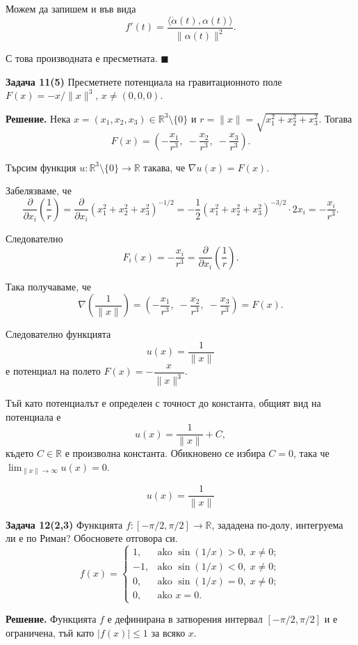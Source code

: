 \documentclass[10pt]{article}
\begin{document}
Можем да запишем и във вида
\[
f'(t) = \frac{\langle \dot\alpha(t),\alpha(t)\rangle}{\|\alpha(t)\|^2}.
\]

С това производната е пресметната. $\blacksquare$

\textbf{Задача 11(5) }Пресметнете потенциала на гравитационното поле $F(x) = -x/\|x\|^3$, $x \neq (0,0,0)$.

\textbf{Решение.} 
Нека $x = (x_1,x_2,x_3) \in \mathbb{R}^3 \setminus \{0\}$ и $r = \|x\| = \sqrt{x_1^2 + x_2^2 + x_3^2}$. Тогава
\[
F(x) = \left( -\frac{x_1}{r^3},\; -\frac{x_2}{r^3},\; -\frac{x_3}{r^3} \right).
\]

Търсим функция $u : \mathbb{R}^3 \setminus \{0\} \to \mathbb{R}$ такава, че $\nabla u(x) = F(x)$.

Забелязваме, че
\[
\frac{\partial}{\partial x_i} \left( \frac{1}{r} \right) = \frac{\partial}{\partial x_i} (x_1^2 + x_2^2 + x_3^2)^{-1/2} = -\frac12 (x_1^2+x_2^2+x_3^2)^{-3/2} \cdot 2x_i = -\frac{x_i}{r^3}.
\]

Следователно
\[
F_i(x) = -\frac{x_i}{r^3} = \frac{\partial}{\partial x_i} \left( \frac{1}{r} \right).
\]

Така получаваме, че
\[
\nabla \left( \frac{1}{\|x\|} \right) = \left( -\frac{x_1}{r^3},\; -\frac{x_2}{r^3},\; -\frac{x_3}{r^3} \right) = F(x).
\]

Следователно функцията
\[
u(x) = \frac{1}{\|x\|}
\]
е потенциал на полето $F(x) = -\dfrac{x}{\|x\|^3}$.

Тъй като потенциалът е определен с точност до константа, общият вид на потенциала е
\[
u(x) = \frac{1}{\|x\|} + C,
\]
където $C \in \mathbb{R}$ е произволна константа. Обикновено се избира $C = 0$, така че $\displaystyle \lim_{\|x\|\to\infty} u(x) = 0$.

\[
\boxed{u(x) = \dfrac{1}{\|x\|}}
\]

\textbf{Задача 12(2,3) }Функцията $f : [-\pi/2, \pi/2] \to \mathbb{R}$, зададена по-долу, интегруема ли е по Риман? Обосновете отговора си.
\[
f(x) = 
\begin{cases}
1, & \text{ako } \sin(1/x) > 0,\; x \ne 0; \\
-1, & \text{ako } \sin(1/x) < 0,\; x \ne 0; \\
0, & \text{ako } \sin(1/x) = 0,\; x \ne 0; \\
0, & \text{ako } x = 0.
\end{cases}
\]

\textbf{Решение.} 
Функцията $f$ е дефинирана в затворения интервал $[-\pi/2,\pi/2]$ и е ограничена, тъй като $|f(x)| \le 1$ за всяко $x$.
\end{document}
